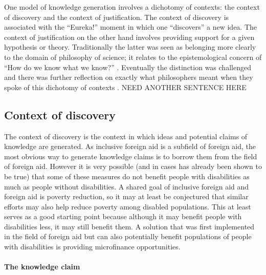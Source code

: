 \documentclass[a4paper]{article}
\begin{document}
One model of knowledge generation involves a dichotomy of contexts: the
context of discovery and the context of justification. The context of
discovery is associated with the ``Eureka!'' moment in which one ``discovers''
a new idea. The context of justification on the other hand involves providing
support for a given hypothesis or theory. Traditionally the latter was seen as
belonging more clearly to the domain of philosophy of science; it relates to
the epistemological concern of ``How do we know what we know?''
\citep{schickore2014scientific}. Eventually the distinction was challenged and
there was further reflection on exactly what philosophers meant when they
spoke of this dichotomy of contexts \citep{hoyningen2006context}. 
NEED ANOTHER SENTENCE HERE

\subsection{Context of discovery}

The context of discovery is the context in which ideas and potential claims of
knowledge are generated. As inclusive foreign aid is a subfield of foreign
aid, the most obvious way to generate knowledge claims is to borrow them from
the field of foreign aid. However it is very possible (and in cases has
already been shown to be true) that some of these measures do not benefit
people with disabilities as much as people without disabilities. A shared goal
of inclusive foreign aid and foreign aid is poverty reduction, so it may at
least be conjectured that similar efforts may also help reduce poverty among
disabled populations. This at least serves as a good starting point because
although it may benefit people with disabilities less, it may still benefit
them. A solution that was first implemented in the field of foreign aid but
can also potentially benefit populations of people with disabilities is
providing microfinance opportunities.

\paragraph{The knowledge claim}
\end{document}
